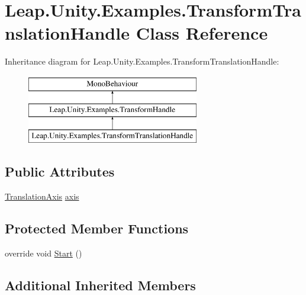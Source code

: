 \hypertarget{class_leap_1_1_unity_1_1_examples_1_1_transform_translation_handle}{}\section{Leap.\+Unity.\+Examples.\+Transform\+Translation\+Handle Class Reference}
\label{class_leap_1_1_unity_1_1_examples_1_1_transform_translation_handle}
Inheritance diagram for Leap.\+Unity.\+Examples.\+Transform\+Translation\+Handle\+:\begin{figure}[H]
\begin{center}
\leavevmode
\includegraphics[height=3.000000cm]{class_leap_1_1_unity_1_1_examples_1_1_transform_translation_handle}
\end{center}
\end{figure}
\subsection*{Public Attributes}
\begin{DoxyCompactItemize}
\item 
\mbox{\hyperlink{namespace_leap_1_1_unity_1_1_examples_a76ed01cc0aaa8ede4fc75e38919a60a5}{Translation\+Axis}} \mbox{\hyperlink{class_leap_1_1_unity_1_1_examples_1_1_transform_translation_handle_a12667312bb2935f407f0267fcea4384e}{axis}}
\end{DoxyCompactItemize}
\subsection*{Protected Member Functions}
\begin{DoxyCompactItemize}
\item 
override void \mbox{\hyperlink{class_leap_1_1_unity_1_1_examples_1_1_transform_translation_handle_af127ad72e9df2429fab712a75b16e115}{Start}} ()
\end{DoxyCompactItemize}
\subsection*{Additional Inherited Members}


